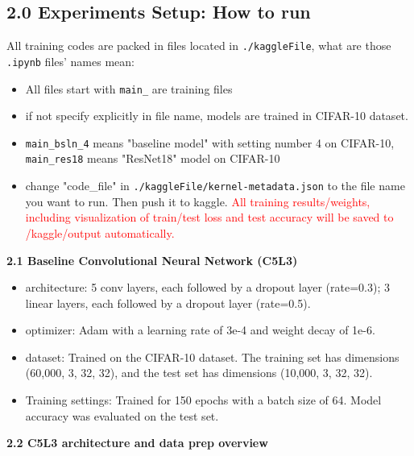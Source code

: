 \documentclass{article}
\newcommand{\subs}[1]{\subsection*{#1}}
\begin{document}
\subs{2.0 Experiments Setup: How to run}
All training codes are packed in files located in \texttt{./kaggleFile}, what are those \texttt{.ipynb} files' names mean:
\begin{itemize}
  \item All files start with \texttt{main\_} are training files
  \item if not specify explicitly in file name, models are trained in CIFAR-10 dataset.
  \item \texttt{main\_bsln\_4} means "baseline model" with setting number 4 on CIFAR-10, \texttt{main\_res18} means "ResNet18" model on CIFAR-10 
  \item change "code\_file" in \texttt{./kaggleFile/kernel-metadata.json} to the file name you want to run. Then push it to kaggle. \textcolor{red}{All training results/weights, including visualization of train/test loss and test accuracy will be saved to /kaggle/output automatically.}
\end{itemize}

\noindent \textbf{2.1 Baseline Convolutional Neural Network (C5L3) }
\begin{itemize}
  \item   architecture:  5 conv layers, each followed by a dropout layer (rate=0.3); 3 linear layers, each followed by a dropout layer (rate=0.5).
  \item   optimizer: Adam with a learning rate of 3e-4 and weight decay of 1e-6.
  \item   dataset: Trained on the CIFAR-10 dataset. The training set has dimensions (60,000, 3, 32, 32), and the test set has dimensions (10,000, 3, 32, 32).
  \item   Training settings: Trained for 150 epochs with a batch size of 64. Model accuracy was evaluated on the test set.
\end{itemize}
\vspace{5mm}
\noindent \textbf{2.2 C5L3 architecture and data prep overview}
\end{document}
